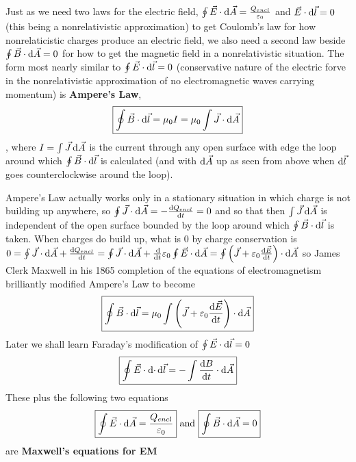 Just as we need two laws for the electric field, $\oint \vec{E} \cdot \operatorname{d\!} \vec{A} = \frac{Q_{encl}}{\varepsilon_0}$ and $\vec{E} \cdot \operatorname{d\!} \vec{l} = 0$ (this being a nonrelativistic approximation) to get Coulomb's law for how nonrelaticistic charges produce an electric field, we also need a second law beside $\oint \vec{B} \cdot \operatorname{d\!} \vec{A} = 0$ for how to get the magnetic field in a nonrelativistic situation. The form most nearly similar to $\oint \vec{E} \cdot \operatorname{d\!} \vec{l} = 0$ (conservative nature of the electric forve in the nonrelativistic approximation of no electromagnetic waves carrying momentum) is \textbf{Ampere's Law},
\begin{equation}
\boxed{\oint\vec{B} \cdot \operatorname{d\!} \vec{l} = \mu_0 I = \mu_0 \int \vec{J} \cdot \operatorname{d\!} \vec{A}}
\end{equation},
where $I = \int \vec{J} \operatorname{d\!} \vec{A}$ is the current through any open surface with edge the loop around which $\oint \vec{B} \cdot \operatorname{d\!} \vec{l}$ is calculated (and with $\operatorname{d\!} \vec{A}$ up as seen from above when $\operatorname{d\!} \vec{l}$ goes counterclockwise around the loop).

Ampere's Law actually works only in a stationary situation in which charge is not building up anywhere, so $\oint \vec{J} \cdot \operatorname{d\!} \vec{A} = -\frac{\operatorname{d\!} Q_{encl}}{\operatorname{d\!} t} = 0$ and so that then $\int \vec{J} \operatorname{d\!} \vec{A}$ is independent of the open surface bounded by the loop around which $\oint \vec{B} \cdot \operatorname{d\!} \vec{l}$ is taken. When charges do build up, what is 0 by charge conservation is $0 = \oint \vec{J} \cdot \di \vec{A} + \frac{\di Q_{encl}}{\di t} = \oint \vec{J} \cdot \di  \vec{A} + \frac{\di}{\di t} \varepsilon_0 \oint \vec{E} \cdot \di \vec{A} = \oint \left( \vec{J} + \varepsilon_0 \frac{\di \vec{E}}{\di t} \right) \cdot \di \vec{A}$ so James Clerk Maxwell in his 1865 completion of the equations of electromagnetism brilliantly modified Ampere's Law to become
\begin{equation}
\boxed{\oint \vec{B} \cdot \operatorname{d\!} \vec{l} = \mu_0 \int \left( \vec{J} + \varepsilon_0 \frac{\operatorname{d\!} \vec{E}}{\operatorname{d\!} t} \right)\cdot \operatorname{d\!} \vec{A}}
\end{equation} 
Later we shall learn Faraday's modification of $\oint \vec{E} \cdot \operatorname{d\!} \vec{l} = 0$
\begin{equation}
\boxed{\oint \vec{E} \cdot \operatorname{d\!} \cdot \operatorname{d\!} \vec{l} = - \int \frac{\operatorname{d\!} B}{\operatorname{d\!} t} \cdot \operatorname{d\!} \vec{A}}
\end{equation}
These plus the following two equations
\begin{equation}
\boxed{\oint \vec{E} \cdot \operatorname{d\!} \vec{A} = \frac{Q_{encl}}{\varepsilon_0}} \text{   and   } \boxed{\oint \vec{B} \cdot \operatorname{d\!} \vec{A} = 0} 
\end{equation}
are \textbf{Maxwell's equations for EM}

